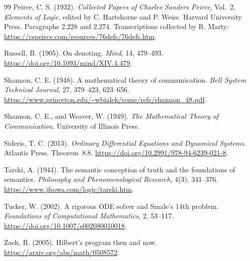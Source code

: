 \documentclass[11pt,a4paper]{article}
\theoremstyle{definition}
\begin{document}
\begin{thebibliography}{99}
Peirce, C. S. (1932). \emph{Collected Papers of Charles Sanders Peirce},
Vol.~2, \emph{Elements of Logic}, edited by C. Hartshorne and P. Weiss.
Harvard University Press. Paragraphs 2.228 and 2.274.
Transcriptions collected by R. Marty:
\url{https://cspeirce.com/rsources/76defs/76defs.htm}.

Russell, B. (1905). On denoting.
\emph{Mind}, 14, 479--493.
\url{https://doi.org/10.1093/mind/XIV.4.479}.

Shannon, C. E. (1948). A mathematical theory of communication.
\emph{Bell System Technical Journal}, 27, 379--423, 623--656.
\url{https://www.princeton.edu/~wbialek/rome/refs/shannon_48.pdf}.

Shannon, C. E., and Weaver, W. (1949).
\emph{The Mathematical Theory of Communication}.
University of Illinois Press.

Sideris, T. C. (2013). \emph{Ordinary Differential Equations and
Dynamical Systems}. Atlantis Press. Theorem~8.8.
\url{https://doi.org/10.2991/978-94-6239-021-8}.

Tarski, A. (1944). The semantic conception of truth and the foundations
of semantics. \emph{Philosophy and Phenomenological Research},
4(3), 341--376. \url{https://www.jfsowa.com/logic/tarski.htm}.

Tucker, W. (2002). A rigorous ODE solver and Smale's 14th problem.
\emph{Foundations of Computational Mathematics}, 2, 53--117.
\url{https://doi.org/10.1007/s002080010018}.

Zach, R. (2005). Hilbert's program then and now.
\url{https://arxiv.org/abs/math/0508572}.

\end{thebibliography}
\end{document}
